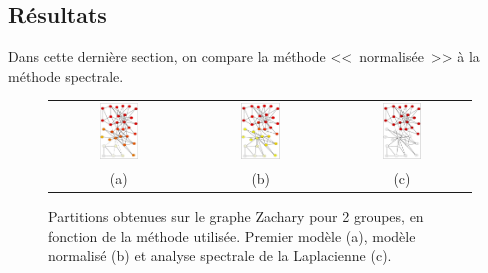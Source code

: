 \documentclass[12pt]{article}
\begin{document}
\subsection{Résultats}
Dans cette dernière section, on compare la méthode <<~normalisée~>> à la
méthode spectrale.

\begin{figure}[bth]
	\begin{center}
		\begin{tabular}[h]{ccc}
		\includegraphics[width=0.30\textwidth]{za-m1-2}&
		\includegraphics[width=0.30\textwidth]{za-m2-2}&
		\includegraphics[width=0.30\textwidth]{za-m2-2-sp}
		\vspace{-5mm}
		\\
		(a) & (b) & (c)
		\end{tabular}
	\end{center}
	\caption{Partitions obtenues sur le graphe Zachary pour 2 groupes, en fonction de la méthode utilisée. Premier modèle (a), modèle
	normalisé (b) et analyse spectrale de la Laplacienne (c).}
	\label{fig:partitions}
\end{figure}
\end{document}
